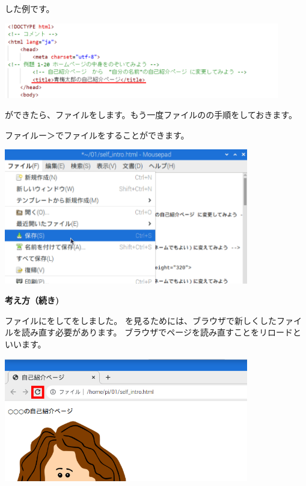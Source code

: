 \flushleft
{}した例です。

\centering
\includegraphics[width=0.9\textwidth]{text01-img/textbook-img148.png}


\bigskip

\flushleft
{}ができたら、ファイルをします。もう一度ファイルのの手順をしておきます。

ファイルー＞でファイルをすることができます。



\centering
\includegraphics[width=0.8\textwidth]{text01-img/textbook-img147.png}



\clearpage
\flushleft
\textbf{考え方（続き)}




ファイルにをしてをしました。
を見るためには、ブラウザで新しくしたファイルを読み直す必要があります。
ブラウザでページを読み直すことをリロードといいます。


\bigskip


\bigskip
\centering
\includegraphics[width=0.8\textwidth]{text01-img/textbook-img149.png}

